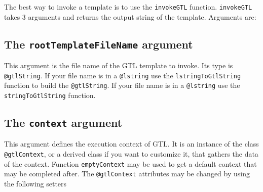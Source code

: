 \documentclass[10pt,openright,twosides,final]{memoir}
\newcommand{\gginline}[1]{\colorbox{light-pink}{\lstinline[language=galgas]{#1}}}
\begin{document}
The best way to invoke a template is to use the \gginline{invokeGTL} function. \gginline{invokeGTL} takes 3 arguments and returns the output string of the template. Arguments are:

\subsection{The \texttt{rootTemplateFileName} argument}

This argument is the file name of the GTL template to invoke. Its type is \gginline{@gtlString}. If your file name is in a \gginline{@lstring} use the \gginline{lstringToGtlString} function to build the \gginline{@gtlString}. If your file name is in a \gginline{@lstring} use the \gginline{stringToGtlString} function.

\subsection{The \texttt{context} argument}

This argument defines the execution context of GTL. It is an instance of the class \gginline{@gtlContext}, or a derived class if you want to customize it, that gathers the data of the context. Function \gginline{emptyContext} may be used to get a default context that may be completed after. The \gginline{@gtlContext} attributes may be changed by using the following setters


\end{document}
